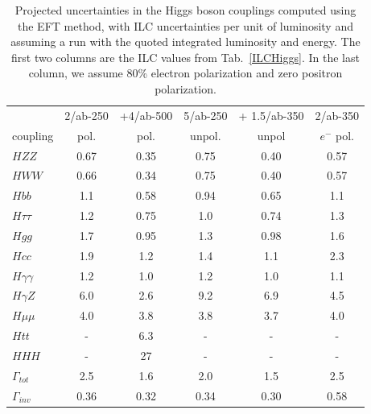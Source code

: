 \begin{table}[!htbp]
\begin{center}
\begin{tabular}{l|cc|c|c|c}
 &  2/ab-250 & +4/ab-500 &  5/ab-250 &  + 1.5/ab-350 &  2/ab-350 \\
coupling &  pol.  &   pol.  &   unpol.  &  unpol &  $e^-$  pol. 
  \\  \hline 
$HZZ$            &             0.67&   0.35    &   0.75   & 0.40     &  0.57            \\ 
$HWW$            &         0.66  &   0.34   &   0.75   &   0.40   &   0.57    \\ 
 $Hbb$            &              1.1  &  0.58   &  0.94    &    0.65  &   1.1   \\ 
$H\tau\tau$    &          1.2  &   0.75   &   1.0   &  0.74    &   1.3     \\ 
$Hgg$ &                      1.7  & 0.95       &  1.3    &  0.98    &   1.6    \\ 
$Hcc$                       &   1.9  &  1.2   &   1.4   &   1.1   &    2.3  \\ 
$H\gamma\gamma$ &  1.2 &   1.0     &  1.2    &   1.0   &    1.1    \\ 
$H\gamma Z$ &  6.0 &   2.6     &  9.2    &   6.9   &    4.5    \\
$H\mu\mu$                &  4.0  &  3.8     &  3.8    &  3.7    &    4.0
 \\ 
$Htt$  &                       -     &      6.3     &  -    &  -    &
-     \\ 
$HHH$                         &  -    &   27     &   -   &   -   &   -
 \\ \hline 
$\Gamma_{tot}$             & 2.5  & 1.6    &   2.0    &  1.5     &
2.5    \\  
$\Gamma_{inv}$          &   0.36  & 0.32    &  0.34    &  0.30   &   0.58
\\  \hline
\end{tabular}
\end{center}
\caption{ \label{tab:oursimple}    Projected uncertainties in the Higgs
  boson couplings computed using the EFT method, with  ILC uncertainties per unit of luminosity and assuming a run with the quoted integrated luminosity
  and energy.   The first two columns are the ILC values from 
  Tab.~\ref{ILCHiggs}.   In the last column, we assume 80\% electron polarization and zero positron polarization.  }
\end{table}
